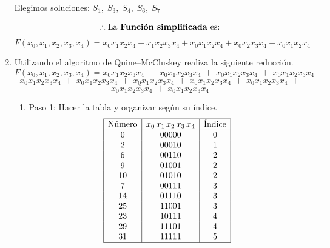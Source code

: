 \documentclass[12pt,letterpaper]{article}
\begin{document}
\begin{enumerate}[label=\arabic*.]
  Elegimos soluciones: $S_1,\; S_3,\; S_4,\; S_6,\; S_7$

  \[
  \therefore \text{La \textbf{Funci\'{o}n simplificada} es:}
  \]
  \[
  F(x_0, x_1, x_2, x_3, x_4) = \overline{x_0x_1x_2x_4} + x_1\overline{x_2x_3}x_4 + \overline{x_0}x_1x_2\overline{x_4} + x_0x_2x_3x_4 + x_0x_1x_2x_4
  \]
  \bigskip
  
\item Utilizando el algoritmo de Quine–McCluskey realiza la siguiente reducción.
  \[
  F(x_0, x_1, x_2, x_3, x_4) = \overline{x_0x_1x_2x_3x_4}\; +\; \overline{x_0x_1x_2}x_3\overline{x_4}\; +\; \overline{x_0x_1}x_2x_3\overline{x_4}\; +\; \overline{x_0x_1}x_2x_3x_4\; +
  \]
  \[
  \overline{x_0}x_1x_2x_3\overline{x_4}\; +\; \overline{x_0}x_1\overline{x_2}x_3\overline{x_4}\; +\; x_0\overline{x_1}x_2x_3x_4\; +\; x_0x_1\overline{x_2x_3}x_4\; +\; \overline{x_0}x_1\overline{x_2x_3}x_4\; +
  \]
  \[
  x_0x_1x_2\overline{x_3}x_4\; +\;  x_0x_1x_2x_3x_4
  \]

  \begin{enumerate}[label=\arabic*)]
  \item Paso 1: Hacer la tabla y organizar según su índice.
    \[
    \begin{array}{| c | c | c |}
      \hline
      \text{Número} & x_0\,x_1\,x_2\,x_3\,x_4 & \text{Índice} \\
      \hline
      0  & 00000 & 0 \\
      2  & 00010 & 1 \\
      6  & 00110 & 2 \\
      9  & 01001 & 2 \\
      10 & 01010 & 2 \\
      7  & 00111 & 3 \\
      14 & 01110 & 3 \\
      25 & 11001 & 3 \\
      23 & 10111 & 4 \\
      29 & 11101 & 4 \\
      31 & 11111 & 5 \\
      \hline
    \end{array}
    \]
    

\end{enumerate}
\end{enumerate}
\end{document}
